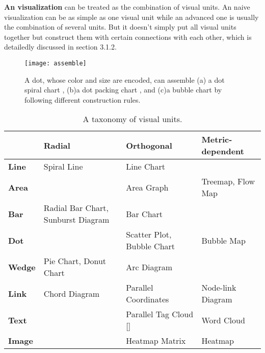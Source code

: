 \textbf{An visualization} can be treated as the combination of visual units. An naive visualization can be as simple as one visual unit while an advanced one is usually the combination of several units. But it doesn't simply put all visual units together but construct them with certain connections with each other, which is detailedly discussed in section 3.1.2.



\begin{figure}
\begin{minipage}{\columnwidth}
 \centering %
 \texttt{[image: assemble]}
\caption[assemble]
{ A dot, whose color and size are encoded, can assemble 
(a) a dot spiral chart
\protect\footnotemark{}
    , (b)a dot packing chart
  \footnotemark{}
  , and (c)a bubble chart
  \footnotemark{}
   by following different construction rules.
}
\end{minipage}
\label{fig:hierarchic}
\end{figure}

\begin{table}[tb]
  \caption{A taxonomy of visual units.}
  \label{tab:unit}
  \small
  \centering
  \begin{tabular}{p{0.8cm}|p{1.8cm}|p{2.0cm}|p{2.4cm}}
  \toprule
 \textbf{} &\textbf{Radial} & \textbf{Orthogonal} & \textbf{Metric-dependent}   \\ 
  \midrule
  \textbf{Line} &Spiral Line & Line Chart & \\ 
  \midrule
  \textbf{Area} & &Area Graph  & Treemap, Flow Map \\ 
  \midrule
  \textbf{Bar} &Radial Bar Chart, Sunburst Diagram & Bar Chart & \\
  \midrule
  \textbf{Dot} & &Scatter Plot, Bubble Chart &Bubble Map \\
  \midrule
  \textbf{Wedge} & Pie Chart, Donut Chart &Arc Diagram & \\
  \midrule
  \textbf{Link} &Chord Diagram &Parallel Coordinates &Node-link Diagram \\
  \midrule
  \textbf{Text} & &Parallel Tag Cloud [] &Word Cloud \\
  \midrule
  \textbf{Image} & &Heatmap Matrix &Heatmap \\

  \bottomrule

  \end{tabular}
  \vspace{1mm}
\end{table}

